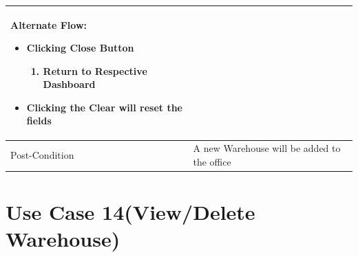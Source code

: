 \documentclass[12pt,a4paper]{report}
\begin{document}
\begin{tabular}{ | m{3cm} | m{12cm}| }
\begin{enumerate}
\end{enumerate}

Alternate Flow:

\begin{itemize}
\item 	Clicking Close Button
	\begin{enumerate}
		\item 	Return to Respective Dashboard
	\end{enumerate}
\item Clicking the Clear will reset the fields
\end{itemize}
\\ \hline
Post-Condition &  A new Warehouse will be added to the office   \\ \hline

\end{tabular}
\section{Use Case 14(View/Delete Warehouse)}
\end{document}
